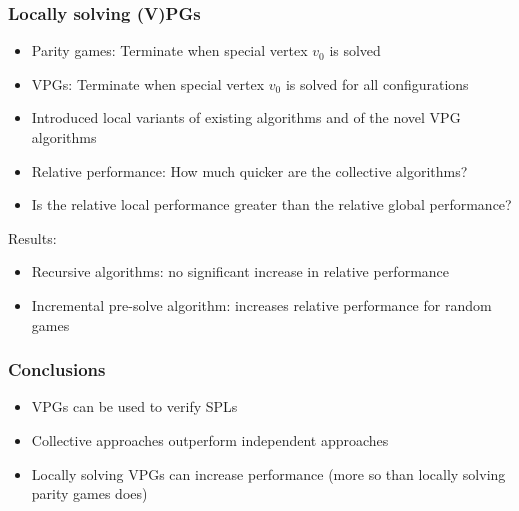 \documentclass[aspectratio=169]{beamer}
\begin{document}

\begin{frame}[t]
\frametitle{Locally solving (V)PGs}
\begin{itemize}
	\item Parity games: Terminate when special vertex $v_0$ is solved
	\item VPGs: Terminate when special vertex $v_0$ is solved for all configurations\pause
	\item Introduced local variants of existing algorithms and of the novel VPG algorithms\pause
	\item Relative performance: How much quicker are the collective algorithms?
	\item Is the relative local performance greater than the relative global performance?
\end{itemize}\pause
\large Results:
\begin{itemize}
	\item Recursive algorithms: no significant increase in relative performance
	\item Incremental pre-solve algorithm: increases relative performance for random games
\end{itemize}
\end{frame}


\begin{frame}[t]
\frametitle{Conclusions}
\begin{itemize}
	\item VPGs can be used to verify SPLs
	\item Collective approaches outperform independent approaches
	\item Locally solving VPGs can increase performance (more so than locally solving parity games does)
\end{itemize}
\end{frame}

\end{document}
